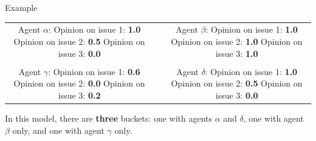 \documentclass[12pt]{beamer}
\begin{document}
\begin{frame}[c]{Example} %

\begin{center}
\begin{tabular}{cp{1cm}c}
\makecell{
\color{darkgreen} \small Agent $\alpha$: \\
\color{darkgreen} \footnotesize Opinion on issue 1: \textbf{1.0} \\
\color{darkgreen} \footnotesize Opinion on issue 2: \textbf{0.5} \\
\color{darkgreen} \footnotesize Opinion on issue 3: \textbf{0.0} \\
} & &
\makecell{
\color{red} \small Agent $\beta$: \\
\color{red} \footnotesize Opinion on issue 1: \textbf{1.0} \\
\color{red} \footnotesize Opinion on issue 2: \textbf{1.0} \\
\color{red} \footnotesize Opinion on issue 3: \textbf{1.0} \\
} \\
\smallskip \\
\makecell{
\color{blue} \small Agent $\gamma$: \\
\color{blue} \footnotesize Opinion on issue 1: \textbf{0.6} \\
\color{blue} \footnotesize Opinion on issue 2: \textbf{0.0} \\
\color{blue} \footnotesize Opinion on issue 3: \textbf{0.2} \\
} & &
\makecell{
\color{darkgreen} \small Agent $\delta$: \\
\color{darkgreen} \footnotesize Opinion on issue 1: \textbf{1.0} \\
\color{darkgreen} \footnotesize Opinion on issue 2: \textbf{0.5} \\
\color{darkgreen} \footnotesize Opinion on issue 3: \textbf{0.0} \\
} \\
\end{tabular}

\bigskip
{In this model, there are \textbf{three} buckets: one with agents
$\alpha$ and $\delta$, one with agent $\beta$ only, and one with agent $\gamma$
only.}
\end{center}
\end{frame}
\end{document}

